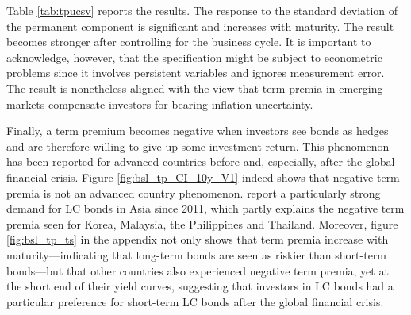 {Table \ref{tab:tpucsv} reports the results. %
The response to the standard deviation of the permanent component is significant %
and increases with maturity.
The result becomes stronger after controlling for the business cycle. 
It is important to acknowledge, however, that the specification might be subject to econometric problems since it involves persistent variables and ignores measurement error.
The result is nonetheless %
aligned with the view that term premia in emerging markets compensate investors for bearing inflation uncertainty.

Finally, a term premium becomes negative when investors see bonds as hedges and are therefore willing to give up some investment return. 
This phenomenon has been reported for advanced countries before and, especially, after the global financial crisis.
Figure \ref{fig:bsl_tp_CI_10y_V1} indeed shows that negative term premia is not an advanced country phenomenon.
\cite{IMFWB:2020} report a particularly strong demand for LC bonds in Asia since 2011, which partly explains the negative term premia seen for Korea, Malaysia, the Philippines and Thailand.
Moreover,
figure \ref{fig:bsl_tp_ts} in the appendix not only shows that term premia increase with maturity---indicating that long-term bonds are seen as riskier than short-term bonds---but that other countries also experienced negative term premia, yet at the short end of their yield curves, %
suggesting that %
investors in LC bonds %
had a particular preference for short-term LC bonds after the global financial crisis.
}
